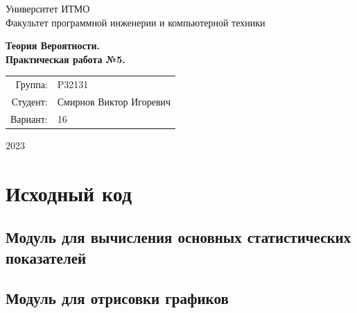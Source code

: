 \documentclass{article}
\begin{document}
\begin{titlepage}
    \begin{center}
        \begin{spacing}{1.4}
            \large{Университет ИТМО} \\
            \large{Факультет программной инженерии и компьютерной техники} \\
        \end{spacing}
        \vfill
        \textbf{
            \huge{Теория Вероятности.} \\
            \huge{Практическая работа №5.} \\
        }
    \end{center}
    \vfill
    \begin{center}
        \begin{tabular}{r l}
            Группа:  & P32131                  \\
            Студент: & Смирнов Виктор Игоревич \\
            Вариант: & 16                      \\
        \end{tabular}
    \end{center}
    \vfill
    \begin{center}
        \begin{large}
            2023
        \end{large}
    \end{center}
\end{titlepage}

\section{Исходный код}

\subsection{Модуль для вычисления основных статистических показателей}



\subsection{Модуль для отрисовки графиков}


\end{document}
